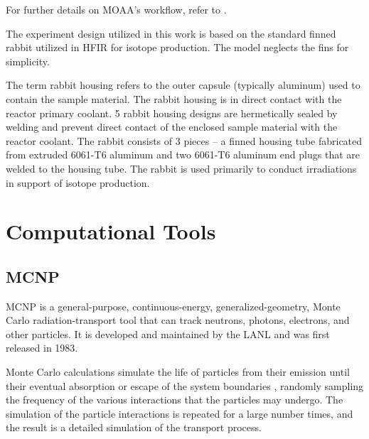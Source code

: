 \label{ch:method}

For further details on MOAA's workflow, refer to \cite{fairhurst_MOAA_2023}.

The experiment design utilized in this work is based on the standard finned rabbit utilized in HFIR for isotope production.
The model neglects the fins for simplicity.

The term rabbit housing refers to the outer capsule (typically aluminum) used to contain the sample material.
The rabbit housing is in direct contact with the reactor primary coolant.
5 rabbit housing designs are hermetically sealed by welding and prevent direct contact of the enclosed sample material with the reactor coolant.
The rabbit consists of 3 pieces – a finned housing tube fabricated from extruded 6061-T6 aluminum and two 6061-T6 aluminum end plugs that are welded to the housing tube.
The rabbit is used primarily to conduct irradiations in support of isotope production.





\section{Computational Tools}


\subsection{MCNP}

MCNP is a general-purpose, continuous-energy, generalized-geometry, Monte Carlo radiation-transport tool that can track neutrons, photons, electrons, and other particles.
It is developed and maintained by the \gls*{LANL} and was first released in 1983.

Monte Carlo calculations simulate the life of particles from their emission until their eventual absorption or escape of the system boundaries \cite{leppanen_devel_2007}, randomly sampling the frequency of the various interactions that the particles may undergo.
The simulation of the particle interactions is repeated for a large number times, and the result is a detailed simulation of the transport process.

